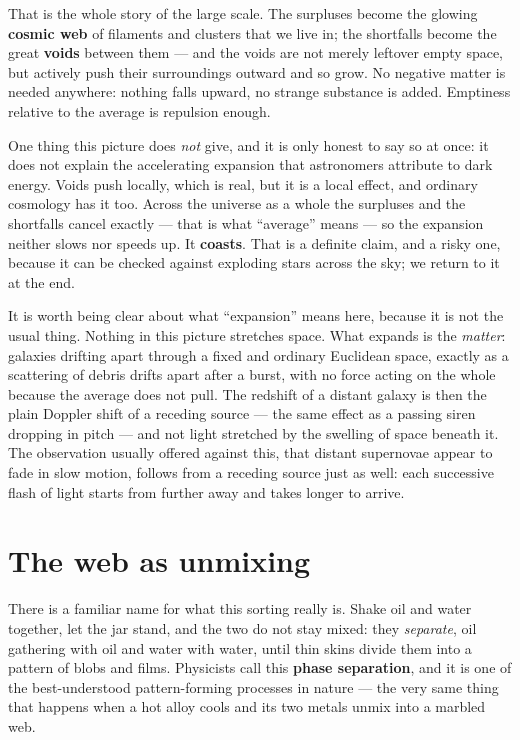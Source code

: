 \documentclass[11pt]{article}
\begin{document}
That is the whole story of the large scale. The surpluses become the glowing \textbf{cosmic web} of filaments and
clusters that we live in; the shortfalls become the great \textbf{voids} between them --- and the voids are not
merely leftover empty space, but actively push their surroundings outward and so grow. No negative matter is
needed anywhere: nothing falls upward, no strange substance is added. Emptiness relative to the average is
repulsion enough.

One thing this picture does \emph{not} give, and it is only honest to say so at once: it does not explain the
accelerating expansion that astronomers attribute to dark energy. Voids push locally, which is real, but it is a
local effect, and ordinary cosmology has it too. Across the universe as a whole the surpluses and the shortfalls
cancel exactly --- that is what ``average'' means --- so the expansion neither slows nor speeds up. It
\textbf{coasts}. That is a definite claim, and a risky one, because it can be checked against exploding stars
across the sky; we return to it at the end.

It is worth being clear about what ``expansion'' means here, because it is not the usual thing. Nothing in this
picture stretches space. What expands is the \emph{matter}: galaxies drifting apart through a fixed and ordinary
Euclidean space, exactly as a scattering of debris drifts apart after a burst, with no force acting on the whole
because the average does not pull. The redshift of a distant galaxy is then the plain Doppler shift of a receding
source --- the same effect as a passing siren dropping in pitch --- and not light stretched by the swelling of
space beneath it. The observation usually offered against this, that distant supernovae appear to fade in slow
motion, follows from a receding source just as well: each successive flash of light starts from further away and
takes longer to arrive.

\section*{The web as unmixing}
There is a familiar name for what this sorting really is. Shake oil and water together, let the jar stand, and the
two do not stay mixed: they \emph{separate}, oil gathering with oil and water with water, until thin skins divide
them into a pattern of blobs and films. Physicists call this \textbf{phase separation}, and it is one of the
best-understood pattern-forming processes in nature --- the very same thing that happens when a hot alloy cools and
its two metals unmix into a marbled web.
\end{document}
